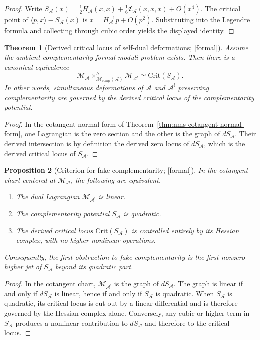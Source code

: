 \documentclass[11pt,oneside]{memoir}
\numberwithin{equation}{chapter}
\newtheorem{theorem}{Theorem}[chapter]
\newtheorem{proposition}[theorem]{Proposition}
\theoremstyle{definition}
\newcommand{\ClaimStatusProvedHere}{\textnormal{[formal]}}
\newcommand{\cA}{\mathcal A}
\begin{document}
\begin{proof}
Write $S_{\cA}(x) = \frac12 H_{\cA}(x,x) + \frac16 \mathfrak C_{\cA}(x,x,x) + O(x^4)$.  The critical point of $\langle p,x\rangle - S_{\cA}(x)$ is $x = H_{\cA}^{-1}p + O(p^2)$.  Substituting into the Legendre formula and collecting through cubic order yields the displayed identity.\qedhere
\end{proof}

\begin{theorem}[Derived critical locus of self-dual deformations; \ClaimStatusProvedHere]
\label{thm:nms-derived-critical-locus}
Assume the ambient complementarity formal moduli problem exists.  Then there is a canonical equivalence
\[
\mathcal M_{\cA}\times^h_{\mathcal M_{\mathrm{comp}}(\cA)}\mathcal M_{\cA^!}
\simeq
\mathrm{Crit}(S_{\cA}).
\]
In other words, simultaneous deformations of $\cA$ and $\cA^!$ preserving complementarity are governed by the derived critical locus of the complementarity potential.
\end{theorem}

\begin{proof}
In the cotangent normal form of Theorem~\ref{thm:nms-cotangent-normal-form}, one Lagrangian is the zero section and the other is the graph of $dS_{\cA}$.  Their derived intersection is by definition the derived zero locus of $dS_{\cA}$, which is the derived critical locus of $S_{\cA}$.\qedhere
\end{proof}

\begin{proposition}[Criterion for fake complementarity; \ClaimStatusProvedHere]
\label{prop:nms-fake-complementarity}
In the cotangent chart centered at $\mathcal M_{\cA}$, the following are equivalent.
\begin{enumerate}[label=\textup{(\roman*)}]
\item The dual Lagrangian $\mathcal M_{\cA^!}$ is linear.
\item The complementarity potential $S_{\cA}$ is quadratic.
\item The derived critical locus $\mathrm{Crit}(S_{\cA})$ is controlled entirely by its Hessian complex, with no higher nonlinear operations.
\end{enumerate}
Consequently, the first obstruction to fake complementarity is the first nonzero higher jet of $S_{\cA}$ beyond its quadratic part.
\end{proposition}

\begin{proof}
In the cotangent chart, $\mathcal M_{\cA^!}$ is the graph of $dS_{\cA}$.  The graph is linear if and only if $dS_{\cA}$ is linear, hence if and only if $S_{\cA}$ is quadratic.  When $S_{\cA}$ is quadratic, its critical locus is cut out by a linear differential and is therefore governed by the Hessian complex alone.  Conversely, any cubic or higher term in $S_{\cA}$ produces a nonlinear contribution to $dS_{\cA}$ and therefore to the critical locus.\qedhere
\end{proof}
\end{document}
